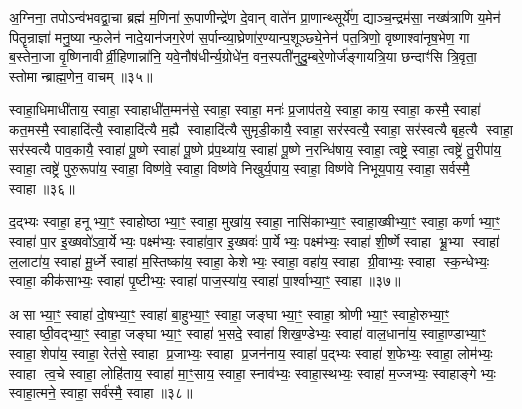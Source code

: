 {\anuvakamend[{अ॒ग्नि॒ष्टो॒मो वि॑शत्व॒ष्टाद॑श च॥13॥}]}

अ॒ग्निना॒ तपोऽन्व॑भवद्वा॒चा ब्रह्म॑ म॒णिना॑ रू॒पाणीन्द्रे॑ण दे॒वान् वाते॑न प्रा॒णान्थ्सूर्ये॑ण॒ द्याञ्च॒न्द्रम॑सा॒ नख्ष॑त्राणि य॒मेन॑ पितॄन्राज्ञा॑ मनु॒ष्यान्फ॒लेन॑ नादे॒यान॑जग॒रेण॑ स॒र्पान्व्या॒घ्रेणा॑र॒ण्यान्प॒शूञ्छ्ये॒नेन॑ पत॒त्रिणो॒ वृष्णाश्वा॑नृष॒भेण॒ गा ब॒स्तेना॒जा वृ॒ष्णिनावीर्व्री॒हिणान्ना॑नि॒ यवे॒नौष॑धीर्न्य॒ग्रोधे॑न॒ वन॒स्पती॑नुदु॒म्बरे॒णोर्ज॑ङ्गायत्रि॒या छन्दाꣳ॑सि त्रि॒वृता॒ स्तोमान्ब्राह्म॒णेन॒ वाचम्॥३५॥

{\anuvakamend[{ब्रा॒ह्म॒णेनैक॑ञ्च॥14॥}]}

स्वाहा॒धिमाधी॑ताय॒ स्वाहा॒ स्वाहाधी॑त॒म्मन॑से॒ स्वाहा॒ स्वाहा॒ मनः॑ प्र॒जाप॑तये॒ स्वाहा॒ काय॒ स्वाहा॒ कस्मै॒ स्वाहा॑ कत॒मस्मै॒ स्वाहादि॑त्यै॒ स्वाहादि॑त्यै म॒ह्यै स्वाहादि॑त्यै सुमृडी॒कायै॒ स्वाहा॒ सर॑स्वत्यै॒ स्वाहा॒ सर॑स्वत्यै बृह॒त्यै स्वाहा॒ सर॑स्वत्यै पाव॒कायै॒ स्वाहा॑ पू॒ष्णे स्वाहा॑ पू॒ष्णे प्र॑प॒थ्या॑य॒ स्वाहा॑ पू॒ष्णे न॒रन्धि॑षाय॒ स्वाहा॒ त्वष्ट्रे॒ स्वाहा॒ त्वष्ट्रे॑ तु॒रीपा॑य॒ स्वाहा॒ त्वष्ट्रे॑ पुरु॒रूपा॑य॒ स्वाहा॒ विष्ण॑वे॒ स्वाहा॒ विष्ण॑वे निखुर्य॒पाय॒ स्वाहा॒ विष्ण॑वे निभूय॒पाय॒ स्वाहा॒ सर्वस्मै॒ स्वाहा॥३६॥

{\anuvakamend[{पु॒रु॒रूपा॑य॒ स्वाहा॒ दश॑ च॥15॥}]}

द॒द्भ्यः स्वाहा॒ हनूभ्या॒ꣳ॒ स्वाहोष्ठाभ्या॒ꣳ॒ स्वाहा॒ मुखा॑य॒ स्वाहा॒ नासि॑काभ्या॒ꣳ॒ स्वाहा॒ख्षीभ्या॒ꣳ॒ स्वाहा॒ कर्णाभ्या॒ꣳ॒ स्वाहा॑ पा॒र इ॒ख्षवो॑ऽवा॒र्येभ्यः॒ पक्ष्म॑भ्यः॒ स्वाहा॑वा॒र इ॒ख्षवः॑ पा॒र्येभ्यः॒ पक्ष्म॑भ्यः॒ स्वाहा॑ शी॒र्\mbox{}ष्णे स्वाहा भ्रू॒भ्या स्वाहा॑ ल॒लाटा॑य॒ स्वाहा॑ मू॒र्ध्ने स्वाहा॑ म॒स्तिष्का॑य॒ स्वाहा॒ केशेभ्यः॒ स्वाहा॒ वहा॑य॒ स्वाहा ग्री॒वाभ्यः॒ स्वाहा स्क॒न्धेभ्यः॒ स्वाहा॒ कीक॑साभ्यः॒ स्वाहा॑ पृ॒ष्टीभ्यः॒ स्वाहा॑ पाज॒स्या॑य॒ स्वाहा॑ पा॒र्श्वाभ्या॒ꣳ॒ स्वाहा॥३७॥

असाभ्या॒ꣳ॒ स्वाहा॑ दो॒षभ्या॒ꣳ॒ स्वाहा॑ बा॒हुभ्या॒ꣳ॒ स्वाहा॒ जङ्घाभ्या॒ꣳ॒ स्वाहा॒ श्रोणीभ्या॒ꣳ॒ स्वाहो॒रुभ्या॒ꣳ॒ स्वाहाष्ठी॒वद्भ्या॒ꣳ॒ स्वाहा॒ जङ्घाभ्या॒ꣳ॒ स्वाहा॑ भ॒सदे॒ स्वाहा॑ शिख॒ण्डेभ्यः॒ स्वाहा॑ वाल॒धाना॑य॒ स्वाहा॒ण्डाभ्या॒ꣳ॒ स्वाहा॒ शेपा॑य॒ स्वाहा॒ रेत॑से॒ स्वाहा प्र॒जाभ्यः॒ स्वाहा प्र॒जन॑नाय॒ स्वाहा॑ प॒द्भ्यः स्वाहा॑ श॒फेभ्यः॒ स्वाहा॒ लोम॑भ्यः॒ स्वाहा त्व॒चे स्वाहा॒ लोहि॑ताय॒ स्वाहा॑ मा॒ꣳ॒साय॒ स्वाहा॒ स्नाव॑भ्यः॒ स्वाहा॒स्थभ्यः॒ स्वाहा॑ म॒ज्जभ्यः॒ स्वाहाङ्गेभ्यः॒ स्वाहा॒त्मने॒ स्वाहा॒ सर्व॑स्मै॒ स्वाहा॥३८॥

{\anuvakamend[{पा॒र्श्वाभ्या॒ꣳ॒ स्वाहा॑ म॒ज्जभ्यः॒ स्वाहा॒ षट्च॑॥16॥}]}

